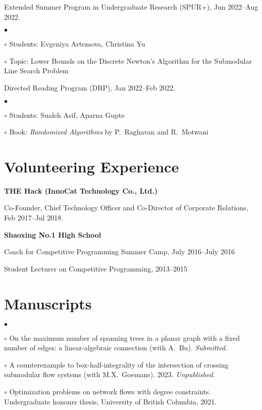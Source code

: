 \documentclass[margin,line]{res}
\newenvironment{list1}{
  \begin{list}{\ding{113}}{%
      \setlength{\itemsep}{0in}
      \setlength{\parsep}{0.025in} \setlength{\parskip}{0in}
      \setlength{\topsep}{0in} \setlength{\partopsep}{0in}
      \setlength{\leftmargin}{0.17in}}}{\end{list}}
\newenvironment{list2}{
  \begin{list}{$\bullet$}{%
      \setlength{\itemsep}{0in}
      \setlength{\parsep}{0in} \setlength{\parskip}{0in}
      \setlength{\topsep}{0in} \setlength{\partopsep}{0in}
      \setlength{\leftmargin}{0.2in}}}{\end{list}}
\newenvironment{list3}{
  \begin{list}{\ding{113}}{%
      \setlength{\itemsep}{0.05in}
      \setlength{\parsep}{0.025in} \setlength{\parskip}{0in}
      \setlength{\topsep}{0in} \setlength{\partopsep}{0in}
      \setlength{\leftmargin}{0.17in}}}{\end{list}}
\begin{document}
\begin{resume}
\begin{list3}
\item[] Extended Summer Program in Undergraduate Research (SPUR+), Jun 2022--Aug 2022.
  \begin{list2}
  \item[$\circ$] Students: Evgeniya Artemova, Christina Yu
  \item[$\circ$] Topic: Lower Bounds on the Discrete Newton's Algorithm for the Submodular Line Search Problem
  \end{list2}
\item[] Directed Reading Program (DRP), Jan 2022--Feb 2022.
  \begin{list2}
  \item[$\circ$] Students: Sualeh Asif, Aparna Gupte
  \item[$\circ$] Book: \emph{Randomized Algorithms} by P.\ Raghavan and R.\ Motwani
  \end{list2}
\end{list3}

\section{\sc Volunteering Experience}

{\bf THE Hack (InnoCat Technology Co., Ltd.)}\\
\vspace*{-.1in}
\begin{list1}
\item[] Co-Founder, Chief Technology Officer and Co-Director of Corporate Relations, Feb 2017--Jul 2018.
\end{list1}

{\bf Shaoxing No.1 High School}\\
\vspace*{-.1in}
\begin{list1}
\item[] Coach for Competitive Programming Summer Camp, July 2016--July 2016
\item[] Student Lecturer on Competitive Programming, 2013--2015
\end{list1}


\section{\sc Manuscripts}

\begin{list2}
  \item[$\circ$] On the maximum number of spanning trees in a planar graph with a fixed number of edges: a linear-algebraic connection (with A.\ Bu). \emph{Submitted.}
  \item[$\circ$] A counterexample to box-half-integrality of the intersection of crossing submodular flow systems (with M.X.\ Goemans). 2023. \emph{Unpublished.}
  \item[$\circ$] Optimization problems on network flows with degree constraints. Undergraduate honours thesis, University of British Columbia, 2021. %
\end{list2}



\end{resume}
\end{document}
